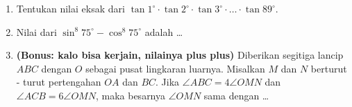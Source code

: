 \documentclass[12pt]{scrartcl}
\begin{document}
\begin{enumerate}
    \item Tentukan nilai eksak dari $\tan 1^\circ \cdot \tan 2^\circ \cdot \tan 3^\circ \cdot \ldots \cdot \tan 89^\circ$.

    \item Nilai dari $\sin^8 75^\circ - \cos^8 75^\circ$ adalah \dots

    \item \textbf{(Bonus: kalo bisa kerjain, nilainya plus plus)}  Diberikan segitiga lancip $ABC$ dengan $O$ sebagai pusat lingkaran luarnya. Misalkan $M$ dan $N$ berturut - turut pertengahan $OA$ dan $BC$. Jika $\angle ABC = 4\angle OMN$ dan $\angle ACB = 6\angle OMN$, maka besarnya $\angle OMN$ sama dengan \dots
\end{enumerate}
\end{document}
